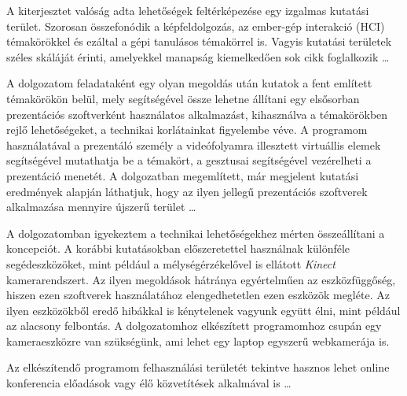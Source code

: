 




A kiterjesztet valóság adta lehetőségek feltérképezése egy izgalmas kutatási terület. Szorosan összefonódik a képfeldolgozás, az ember-gép interakció (HCI) témakörökkel és ezáltal a gépi tanulásos témakörrel is. Vagyis kutatási területek széles skáláját érinti, amelyekkel manapság kiemelkedően sok cikk foglalkozik \ldots

A dolgozatom feladataként egy olyan megoldás után kutatok a fent említett témakörökön belül, mely segítségével össze lehetne állítani egy elsősorban prezentációs szoftverként használatos alkalmazást, kihasználva a témakörökben rejlő lehetőségeket, a technikai korlátainkat figyelembe véve. A programom használatával a prezentáló személy a videófolyamra illesztett virtuállis elemek segítségével mutathatja be a témakört, a gesztusai segítségével vezérelheti a prezentáció menetét. A dolgozatban megemlített, már megjelent kutatási eredmények alapján láthatjuk, hogy az ilyen jellegű prezentációs szoftverek alkalmazása mennyire újszerű terület \ldots

A dolgozatomban igyekeztem a technikai lehetőségekhez mérten összeállítani a koncepciót. A korábbi kutatásokban előszeretettel használnak különféle segédeszközöket, mint például a mélységérzékelővel is ellátott \textit{Kinect} kamerarendszert. Az ilyen megoldások hátránya egyértelműen az eszközfüggőség, hiszen ezen szoftverek használatához elengedhetetlen ezen eszközök megléte. Az ilyen eszközökből eredő hibákkal is kénytelenek vagyunk együtt élni, mint például az alacsony felbontás. A dolgozatomhoz elkészített programomhoz csupán egy kameraeszközre van szükségünk, ami lehet egy laptop egyszerű webkamerája is.

Az elkészítendő programom felhasználási területét tekintve hasznos lehet online konferencia előadások vagy élő közvetítések alkalmával is \ldots

